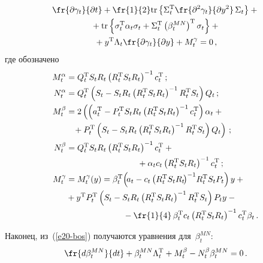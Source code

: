 \begin{multicols}{2}
\noindent
\begin{multline}
     \fr{\partial \gamma_t}{\partial t} +
     \fr{1}{2}\mathrm{tr}\left\{ \Sigma_t^{\mathrm{T}} \fr{\partial^2 
\gamma_t}{\partial y^2}\,\Sigma_t\right\} +{}\\
{}+\mathrm{tr}\left\{ 
\sigma_t^{\mathrm{T}}\alpha_t\sigma_t+\Sigma_t^{\mathrm{T}} \left(\beta_t^{MN}\right)^{\mathrm{T}} 
\sigma_t\right\}+{}\\
{}+
     y^{\mathrm{T}}\Lambda_t\fr{\partial \gamma_t}{\partial y}+M_t^\gamma=0\,,
     \label{e21-bos}
     \end{multline}
где обозначено
\begin{align*}
M_t^\alpha&= Q_t^{\mathrm{T}} S_t R_t\left( R_t^{\mathrm{T}} S_t R_t\right)^{-1} c_t^{\mathrm{T}}\,;\\
N_t^\alpha &=Q_t^{\mathrm{T}}\left( S_t -S_t R_t\left( R_t^{\mathrm{T}} S_t R_t\right)^{-1} 
R_t^{\mathrm{T}}S_t\right)Q_t\,;\\
M_t^\beta&=2\left(\left( a_t^{\mathrm{T}} -P_t^{\mathrm{T}} S_t R_t\left( R_t^{\mathrm{T}} S_t R_t\right)^{-1}
c_t^{\mathrm{T}}\right)\alpha_t+{}\right.\\
&\left.\hspace{2mm}{}+P_t^{\mathrm{T}}\left( S_t-S_tR_t\left( R_t^{\mathrm{T}}S_tR_t\right)^{-1}R_t^{\mathrm{T}} 
S_t\right)Q_t\right)\,;\\
N_t^\beta &= Q_t^{\mathrm{T}} S_t R_t\left( R_t^{\mathrm{T}} S_t R_t\right)^{-1} c_t^{\mathrm{T}} +{}\\
&\hspace*{30mm}{}+\alpha_t c_t 
\left( R_t^{\mathrm{T}} S_t R_t\right)^{-1} c_t^{\mathrm{T}}\,;\\
M_t^\gamma&= M_t^\gamma(y)=\beta_t^{\mathrm{T}} \! \left( \!a_t -c_t\left(R_t^{\mathrm{T}} S_t R_t\!\right)^{-1}\!
 R_t^{\mathrm{T}} S_t P_t\right) y +{}\\
&{}+y^{\mathrm{T}} P_t^{\mathrm{T}} \left( S_t-S_tR_t\left( R_t^{\mathrm{T}} S_t R_t\right)^{-1} R_t^{\mathrm{T}} S_t\right) 
P_t y -{}\\
&\hspace*{24mm}{}-\fr{1}{4}\,\beta_t^{\mathrm{T}} c_t\left( R_t^{\mathrm{T}} S_t R_t\right)^{-1} c_t^{\mathrm{T}} \beta_t\,.
\end{align*}
   
        Наконец, из~(\ref{e20-bos}) получаются уравнения 
для~$\beta_t^{MN}$:
     \begin{equation}
     \fr{d\beta_t^{MN}}{dt}+\beta_t^{MN} \Lambda_t^{\mathrm{T}} +M_t^\beta -
N_t^\beta \beta_t^{MN} =0\,.
     \label{e22-bos}
\end{equation}


\end{multicols}

